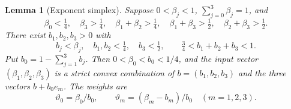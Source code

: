 \documentclass[12pt,reqno]{amsart}
\theoremstyle{plain}
\newtheorem{lemma}[theorem]{Lemma}
\theoremstyle{definition}
\theoremstyle{remark}
\numberwithin{equation}{section}
\begin{document}
\begin{lemma}[Exponent simplex]\label{lem:exponent_simplex}
Suppose $0<\beta_j<1$, $\sum_{j=0}^3\beta_j=1$, and
\begin{equation}\label{eq:extended_region}
 \beta_0<\tfrac14,\quad \beta_3>\tfrac14,\quad
 \beta_1+\beta_2>\tfrac14,\quad
 \beta_1+\beta_3>\tfrac12,\quad\beta_2+\beta_3>\tfrac12.
\end{equation}
There exist $b_1,b_2,b_3>0$ with
\[
 b_j<\beta_j,\quad b_1,b_2<\tfrac14,\quad b_3<\tfrac12,
 \qquad \tfrac34<b_1+b_2+b_3<1.
\]
Put $b_0=1-\sum_{j=1}^3b_j$. Then $0<\beta_0<b_0<1/4$,
and the input vector $(\beta_1,\beta_2,\beta_3)$ is a strict convex
combination of $b=(b_1,b_2,b_3)$ and the three vectors $b+b_0e_m$.
The weights are
\begin{equation}\label{eq:weights}
 \vartheta_0=\beta_0/b_0,\qquad
 \vartheta_m=(\beta_m-b_m)/b_0\quad(m=1,2,3).
\end{equation}
\end{lemma}
\end{document}
